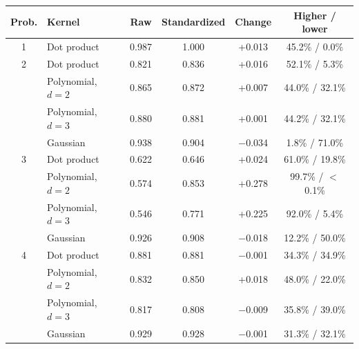 \begin{tabular}{@{}clcccc@{}}
\toprule
Prob. & Kernel & Raw & Standardized & Change & Higher / lower \\
\midrule
1 & Dot product & 0.987 & 1.000 & +0.013 & 45.2\% / 0.0\% \\
\midrule
2 & Dot product & 0.821 & 0.836 & +0.016 & 52.1\% / 5.3\% \\
 & Polynomial, $d=2$ & 0.865 & 0.872 & +0.007 & 44.0\% / 32.1\% \\
 & Polynomial, $d=3$ & 0.880 & 0.881 & +0.001 & 44.2\% / 32.1\% \\
 & Gaussian & 0.938 & 0.904 & $-$0.034 & 1.8\% / 71.0\% \\
\midrule
3 & Dot product & 0.622 & 0.646 & +0.024 & 61.0\% / 19.8\% \\
 & Polynomial, $d=2$ & 0.574 & 0.853 & +0.278 & 99.7\% / $<$0.1\% \\
 & Polynomial, $d=3$ & 0.546 & 0.771 & +0.225 & 92.0\% / 5.4\% \\
 & Gaussian & 0.926 & 0.908 & $-$0.018 & 12.2\% / 50.0\% \\
\midrule
4 & Dot product & 0.881 & 0.881 & $-$0.001 & 34.3\% / 34.9\% \\
 & Polynomial, $d=2$ & 0.832 & 0.850 & +0.018 & 48.0\% / 22.0\% \\
 & Polynomial, $d=3$ & 0.817 & 0.808 & $-$0.009 & 35.8\% / 39.0\% \\
 & Gaussian & 0.929 & 0.928 & $-$0.001 & 31.3\% / 32.1\% \\
\bottomrule
\end{tabular}
